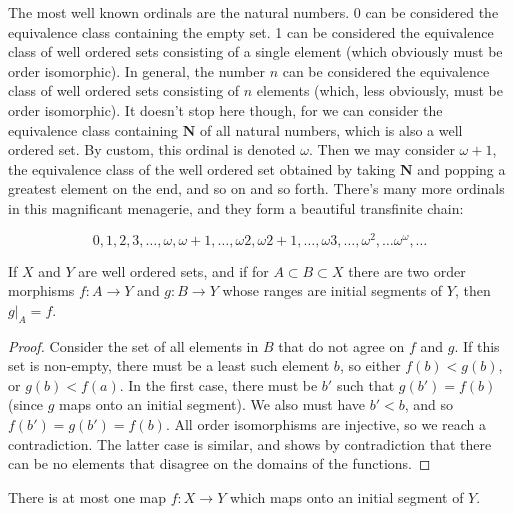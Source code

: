 The most well known ordinals are the natural numbers. 0 can be considered the equivalence class containing the empty set. 1 can be considered the equivalence class of well ordered sets consisting of a single element (which obviously must be order isomorphic). In general, the number $n$ can be considered the equivalence class of well ordered sets consisting of $n$ elements (which, less obviously, must be order isomorphic). It doesn't stop here though, for we can consider the equivalence class containing $\mathbf{N}$ of all natural numbers, which is also a well ordered set. By custom, this ordinal is denoted $\omega$. Then we may consider $\omega + 1$, the equivalence class of the well ordered set obtained by taking $\mathbf{N}$ and popping a greatest element on the end, and so on and so forth. There's many more ordinals in this magnificant menagerie, and they form a beautiful transfinite chain:

\[ 0, 1, 2, 3, \dots, \omega, \omega + 1, \dots, \omega 2, \omega 2 + 1, \dots, \omega 3, \dots, \omega^2, \dots \omega^\omega, \dots  \]

\begin{lemma}
    If $X$ and $Y$ are well ordered sets, and if for $A \subset B \subset X$ there are two order morphisms $f:A \to Y$ and $g:B \to Y$ whose ranges are initial segments of $Y$, then $g|_A = f$.
\end{lemma}
\begin{proof}
    Consider the set of all elements in $B$ that do not agree on $f$ and $g$. If this set is non-empty, there must be a least such element $b$, so either $f(b) < g(b)$, or $g(b) < f(a)$. In the first case, there must be $b'$ such that $g(b') = f(b)$ (since $g$ maps onto an initial segment). We also must have $b' < b$, and so $f(b') = g(b') = f(b)$. All order isomorphisms are injective, so we reach a contradiction. The latter case is similar, and shows by contradiction that there can be no elements that disagree on the domains of the functions.
\end{proof}

\begin{corollary}
    There is at most one map $f:X \to Y$ which maps onto an initial segment of $Y$.
\end{corollary}

